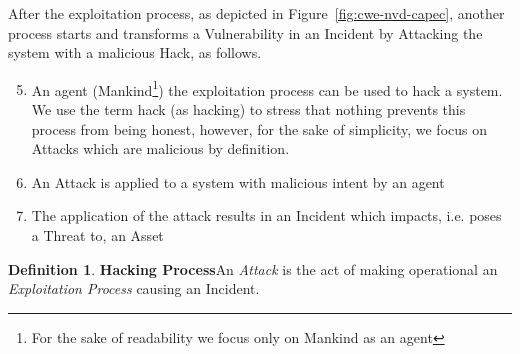 \documentclass{article}
\theoremstyle{definition}
\newtheorem{definition}{Definition}[section]
\theoremstyle{corollary}
\theoremstyle{lemma}
\theoremstyle{theorem}
\theoremstyle{theorem}
\begin{document}
After the exploitation process, as depicted in Figure~\ref{fig:cwe-nvd-capec},
another process starts and transforms a Vulnerability in an Incident by
Attacking the system with a malicious Hack, as follows.
\begin{enumerate}
\setcounter{enumi}{4}
	\item An agent (Mankind\footnote{For the sake of readability we focus
		only on Mankind as an agent}) the exploitation process can be
		used to hack a system. We use the term hack (as hacking) to
		stress that nothing prevents this process from being honest,
		however, for the sake of simplicity, we focus on Attacks which
		are malicious by definition.
	\item An Attack is applied to a system with malicious intent by an
		agent
	\item The application of the attack results in an Incident which
		impacts, i.e. poses a Threat to, an Asset
\end{enumerate}

\begin{definition}{\bf Hacking Process}\label{def:hackingprocess}
An \emph{Attack} is the act of making operational an \emph{Exploitation Process} 
	causing an Incident. 
\end{definition}
\end{document}

